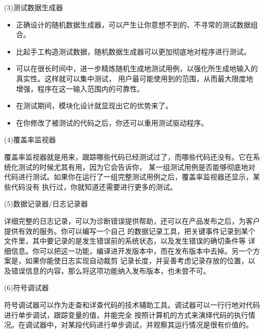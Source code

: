 \documentclass{article}
\begin{document}
\par
(3)测试数据生成器
\par
\begin{itemize}
    \item 正确设计的随机数据生成器，可以产生让你意想不到的、不寻常的测试数据组合。
    \item 比起手工构造测试数据，随机数据生成器可以更加彻底地对程序进行测试。
    \item 可以在很长时间中，进一步精炼随机生成地测试用例，以强化所生成地输入的真实性。这样就可以集中测试，
    用户最可能使用到的范围，从而最大限度地增强，程序在这一输入范围内的可靠性。
    \item 在测试期间，模块化设计就显现出它的优势来了。
    \item 在你修改了被测试的代码之后，你还可以重用测试驱动程序。
\end{itemize}

\par
(4)覆盖率监视器
\par
覆盖率监视器就是用来，跟踪哪些代码已经测试过了，而哪些代码还没有。它在系统化测试的时候尤其有用，因为它会告诉你，
某一组测试用例是否能够彻底地对代码进行测试。如果你在运行了一组完整测试用例之后，覆盖率监视器还显示，某些代码没有
执行过，你就知道还需要进行更多的测试。

\par
(5)数据记录器/日志记录器
\par
详细完整的日志记录，可以为诊断错误提供帮助，还可以在产品发布之后，为客户提供有效的服务。你可以编写一个自己
的数据记录工具，把关键事件记录到某个文件里，其中要记录的是发生错误前的系统状态，以及发生错误的确切条件等
详细信息。你可以把这一功能，编译进开发版本中，而在发布版本中去掉。另一个方案是，如果你能使日志实现自动裁剪
记录长度，并妥善考虑记录存放的位置，以及错误信息的内容，那么将这项功能纳入发布版本，也未尝不可。

\par
(6)符号调试器
\par
符号调试器可以作为走查和详查代码的技术辅助工具。调试器可以一行行地对代码进行单步调试，跟踪变量的值，并能完全
按照计算机的方式来演绎代码的执行情况。在调试器中，对某段代码进行单步调试，并观察其运行情况是很有价值的。
\end{document}

